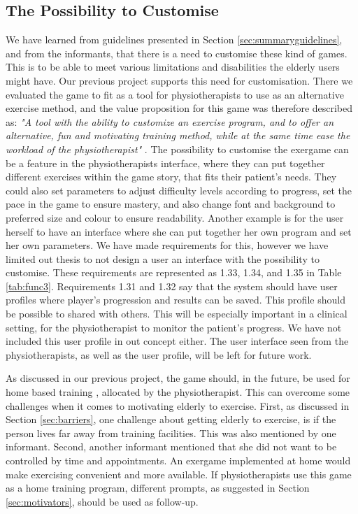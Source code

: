 \subsection{The Possibility to Customise}
We have learned from guidelines presented in Section \ref{sec:summaryguidelines}, and from the informants, that there is a need to customise these kind of games. This is to be able to meet various limitations and disabilities the elderly users might have. Our previous project \cite{project} supports this need for customisation. There we evaluated the game to fit as a tool for physiotherapists to use as an alternative exercise method, and the value proposition for this game was therefore described as: \emph{"A tool with the ability to customize an exercise program, and to offer an alternative, fun and motivating training method, while at the same time ease the workload of the physiotherapist"} \cite{project}. The possibility to customise the exergame can be a feature in the physiotherapists interface, where they can put together different exercises within the game story, that fits their patient's needs. They could also set parameters to adjust difficulty levels according to progress, set the pace in the game to ensure mastery, and also change font and background to preferred size and colour to ensure readability. Another example is for the user herself to have an interface where she can put together her own program and set her own parameters. We have made requirements for this, however we have limited out thesis to not design a user an interface with the possibility to customise. These requirements are represented as 1.33, 1.34, and 1.35 in Table \ref{tab:func3}. Requirements 1.31 and 1.32 say that the system should have user profiles where player's progression and results can be saved. This profile should be possible to shared with others. This will be especially important in a clinical setting, for the physiotherapist to monitor the patient's progress. We have not included this user profile in out concept either. The user interface seen from the physiotherapists, as well as the user profile, will be left for future work. 

As discussed in our previous project, the game should, in the future, be used for home based training \cite{project}, allocated by the physiotherapist. This can overcome some challenges when it comes to motivating elderly to exercise. First, as discussed in Section \ref{sec:barriers}, one challenge about getting elderly to exercise, is if the person lives far away from training facilities. This was also mentioned by one informant. Second, another informant mentioned that she did not want to be controlled by time and appointments. An exergame implemented at home would make exercising convenient and more available. If physiotherapists use this game as a home training program, different prompts, as suggested in Section \ref{sec:motivators}, should be used as follow-up. 

